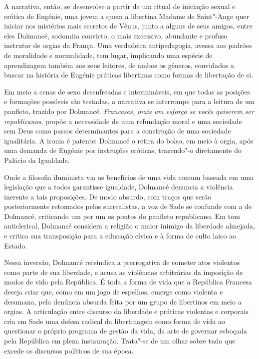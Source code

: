 A narrativa, então, se desenvolve a partir de um ritual de iniciação
sexual e erótica de Eugénie, uma jovem a quem a libertina Madame de
Saint"-Ange quer iniciar nos mistérios mais secretos de Vênus, junto a
alguns de seus amigos, entre eles Dolmancé, sodomita convicto, o mais
excessivo, abundante e profuso instrutor de orgias da França. Uma
verdadeira antipedagogia, avessa aos padrões de moralidade e
normalidade, tem lugar, implicando uma espécie de aprendizagem também aos
seus leitores, de ambos os gêneros, convidados a buscar na
história de Eugénie práticas libertinas como formas de libertação
de si.

Em meio a cenas de sexo desenfreadas e intermináveis, em que todas as
posições e formações possíveis são testadas, a narrativa se interrompe
para a leitura de um panfleto, trazido por Dolmancé. \emph{Franceses,
mais um esforço se vocês quiserem ser republicanos}, propõe a
necessidade de uma refundação moral e uma sociedade sem Deus como passos
determinantes para a construção de uma sociedade igualitária. A ironia é
patente: Dolmancé o retira do bolso, em meio à orgia, após uma demanda
de Eugénie por instruções eróticas, trazendo"-o diretamente do Palácio da
Igualdade.

Onde a filosofia iluminista via os benefícios de uma vida comum baseada
em uma legislação que a todos garantisse igualdade, Dolmancé denuncia a
violência inerente a tais proposições. De modo absurdo, com traços que
serão posteriormente retomados pelos surrealistas, a voz de Sade se confunde
com a de Dolmancé, criticando um por um os
pontos do panfleto republicano. Em tom anticlerical, Dolmancé considera a
religião o maior inimigo da liberdade almejada, e critica sua transposição
para a educação cívica e à forma de culto laico ao Estado.

Nessa inversão, Dolmancé reivindica a prerrogativa de cometer atos
violentos como parte de sua liberdade, e acusa as violências arbitrárias
da imposição de modos de vida pela República. É toda a forma de
vida que a República Francesa deseja criar que, como em um jogo de
espelhos, emerge como violenta e desumana, pela denúncia absurda feita
por um grupo de libertinos em meio a orgias. A articulação entre
discurso da liberdade e práticas violentas e corporais cria em Sade uma
defesa radical da libertinagem como forma de vida ao questionar o
próprio programa de gestão da vida, da arte de governar esboçada pela
República em plena instauração. Trata"-se de um olhar sobre tudo que
excede os discursos políticos de sua época.

